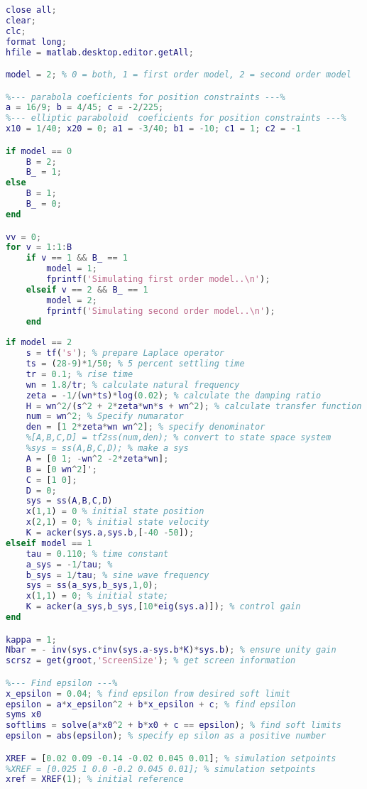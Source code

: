 \begin{lstlisting}[language=matlab]
close all;
clear; 
clc; 
format long;
hfile = matlab.desktop.editor.getAll;

model = 2; % 0 = both, 1 = first order model, 2 = second order model

%--- parabola coeficients for position constraints ---%
a = 16/9; b = 4/45; c = -2/225; 
%--- elliptic paraboloid  coeficients for position constraints ---%
x10 = 1/40; x20 = 0; a1 = -3/40; b1 = -10; c1 = 1; c2 = -1

if model == 0
    B = 2;
    B_ = 1;
else
    B = 1;
    B_ = 0;
end

vv = 0;
for v = 1:1:B
    if v == 1 && B_ == 1
        model = 1;
        fprintf('Simulating first order model..\n');
    elseif v == 2 && B_ == 1
        model = 2;
        fprintf('Simulating second order model..\n');
    end
    
if model == 2
    s = tf('s'); % prepare Laplace operator
    ts = (28-9)*1/50; % 5 percent settling time
    tr = 0.1; % rise time
    wn = 1.8/tr; % calculate natural frequency
    zeta = -1/(wn*ts)*log(0.02); % calculate the damping ratio
    H = wn^2/(s^2 + 2*zeta*wn*s + wn^2); % calculate transfer function
    num = wn^2; % Specify numarator
    den = [1 2*zeta*wn wn^2]; % specify denominator
    %[A,B,C,D] = tf2ss(num,den); % convert to state space system
    %sys = ss(A,B,C,D); % make a sys
    A = [0 1; -wn^2 -2*zeta*wn];
    B = [0 wn^2]';
    C = [1 0];
    D = 0;
    sys = ss(A,B,C,D)
    x(1,1) = 0 % initial state position
    x(2,1) = 0; % initial state velocity
    K = acker(sys.a,sys.b,[-40 -50]);
elseif model == 1
    tau = 0.110; % time constant
    a_sys = -1/tau; %
    b_sys = 1/tau; % sine wave frequency
    sys = ss(a_sys,b_sys,1,0);
    x(1,1) = 0; % initial state;
    K = acker(a_sys,b_sys,[10*eig(sys.a)]); % control gain   
end

kappa = 1;
Nbar = - inv(sys.c*inv(sys.a-sys.b*K)*sys.b); % ensure unity gain
scrsz = get(groot,'ScreenSize'); % get screen information

%--- Find epsilon ---%
x_epsilon = 0.04; % find epsilon from desired soft limit
epsilon = a*x_epsilon^2 + b*x_epsilon + c; % find epsilon
syms x0
softlims = solve(a*x0^2 + b*x0 + c == epsilon); % find soft limits
epsilon = abs(epsilon); % specify ep silon as a positive number

XREF = [0.02 0.09 -0.14 -0.02 0.045 0.01]; % simulation setpoints
%XREF = [0.025 1 0.0 -0.2 0.045 0.01]; % simulation setpoints
xref = XREF(1); % initial reference


\end{lstlisting}
